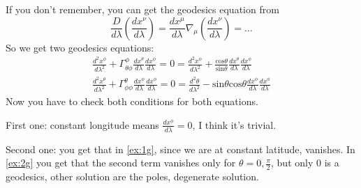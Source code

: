 If you don't remember, you can get the geodesics equation from
\[
\frac{D}{d\lambda }\left( \frac{dx^{\nu }}{d\lambda } \right) = \frac{d x^{\mu }}{d \lambda }\nabla _{\mu }\left( \frac{d x^{\nu }}{d \lambda } \right) = \ldots 
\]
So we get two geodesics equations:
\begin{gather}
	\frac{d ^{2}x^{\phi }}{d \lambda ^{2}} + \Gamma ^{\phi }_{\theta \phi }\frac{d x^{\theta }}{d \lambda }\frac{d x^{\phi }}{d \lambda } =0  = \frac{d ^{2}x^{\phi }}{d \lambda ^{2}} + \frac{\text{cos}\theta }{\text{sin}\theta }\frac{d x^{\theta }}{d \lambda }\frac{d x^{\phi }}{d \lambda } \label{ex:1g}\\
	\frac{d^{2}x^{\theta }}{d\lambda ^{2}} + \Gamma ^{\theta }_{\phi \phi }\frac{d x^{\phi }}{d \lambda }\frac{d x^{\phi }}{d \lambda } = 0  = \frac{d ^{2}\theta }{d \lambda ^{2}} - \text{sin}\theta \text{cos}\theta \frac{d x^{\phi }}{d \lambda }\frac{d x^{\phi }}{d \lambda }\label{ex:2g}
\end{gather}
Now you have to check both conditions for both equations.\par
First one: constant longitude means $\frac{d x^{\phi }}{d \lambda } = 0$, I think it's trivial. \par
Second one: you get that in \ref{ex:1g}, since we are at constant latitude, vanishes. In \ref{ex:2g} you get that the second term vanishes only for $\theta =0 , \frac{\pi }{2}$, but only 0 is a geodesics, other solution are the poles, degenerate solution. 























